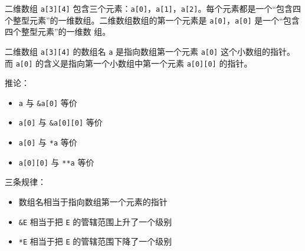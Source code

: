 \documentclass[UTF8]{ctexart}
\begin{document}
二维数组 \texttt{a[3][4]} 包含三个元素：\texttt{a[0]}，\texttt{a[1]}，\texttt{a[2]}。每个元素都是一个“包含四
个整型元素”的一维数组。二维数组数组的第一个元素是 \texttt{a[0]}，\texttt{a[0]} 是一个“包含四个整型元素”的一维数
组。

二维数组 \texttt{a[3][4]} 的数组名 \texttt{a} 是指向数组第一个元素 \texttt{a[0]} 这个小数组的指针。而
\texttt{a[0]} 的含义是指向第一个小数组中第一个元素 \texttt{a[0][0]} 的指针。

推论：
\begin{itemize}
    \item \texttt{a} 与 \texttt{\&a[0]} 等价
    \item \texttt{a[0]} 与 \texttt{\&a[0][0]} 等价
    \item \texttt{a[0]} 与 \texttt{*a} 等价
    \item \texttt{a[0][0]} 与 \texttt{**a} 等价
\end{itemize}

三条规律：
\begin{itemize}
    \item 数组名相当于指向数组第一个元素的指针
    \item \texttt{\&E} 相当于把 \texttt{E} 的管辖范围上升了一个级别
    \item \texttt{*E} 相当于把 \texttt{E} 的管辖范围下降了一个级别
\end{itemize}
\end{document}
